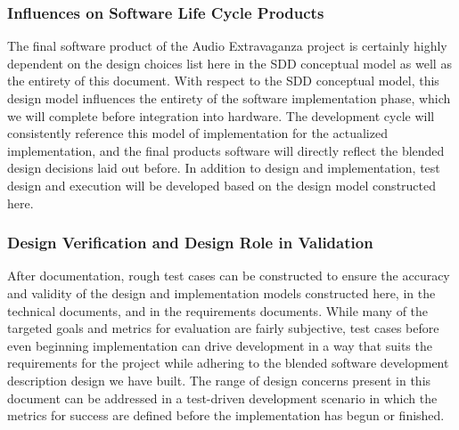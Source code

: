 \subsubsection{Influences on Software Life Cycle Products}
The final software product of the Audio Extravaganza project is certainly highly dependent on the design choices list here in the SDD conceptual model as well as the entirety of this document. With respect to the SDD conceptual model, this design model influences the entirety of the software implementation phase, which we will complete before integration into hardware. The development cycle will consistently reference this model of implementation for the actualized implementation, and the final product\textsc{}s software will directly reflect the blended design decisions laid out before. In addition to design and implementation, test design and execution will be developed based on the design model constructed here. 

\subsubsection{Design Verification and Design Role in Validation}
After documentation, rough test cases can be constructed to ensure the accuracy and validity of the design and implementation models constructed here, in the technical documents, and in the requirements documents. While many of the targeted goals and metrics for evaluation are fairly subjective, test cases before even beginning implementation can drive development in a way that suits the requirements for the project while adhering to the blended software development description design we have built. The range of design concerns present in this document can be addressed in a test-driven development scenario in which the metrics for success are defined before the implementation has begun or finished. 
